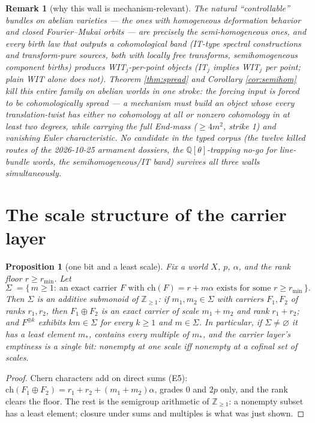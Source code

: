 \documentclass[11pt]{article}
\newtheorem{proposition}{Proposition}
\newtheorem{remark}{Remark}
\begin{document}
\begin{remark}[why this wall is mechanism-relevant]
The natural ``controllable'' bundles on abelian varieties --- the ones with homogeneous deformation
behavior and closed Fourier--Mukai orbits --- are precisely the semi-homogeneous ones, and every birth
law that outputs a cohomological band (IT-type spectral constructions and transform-pure sources,
both with locally free transforms,
semihomogeneous component births) produces WIT$_j$-per-point objects (IT$_j$ implies WIT$_j$ per point;
plain WIT alone does not). Theorem \ref{thm:spread} and
Corollary \ref{cor:semihom} kill this entire family on abelian worlds in one stroke: the forcing input
is \emph{forced to be cohomologically spread} --- a mechanism must build an object whose every
translation-twist has either no cohomology at all or nonzero cohomology in at least two degrees, while carrying the
full End-mass ($\ge4m^2$, strike 1) and vanishing Euler characteristic. No candidate in the typed
corpus (the twelve killed routes of the 2026-10-25 armament dossiers, the $\mathbb{Q}[\theta]$-trapping
no-go for line-bundle words, the semihomogeneous/IT band) survives all three walls simultaneously.
\end{remark}

\section{The scale structure of the carrier layer}\label{sec:scale}

\begin{proposition}[one bit and a least scale]\label{prop:scale}
Fix a world $X$, $p$, $\alpha$, and the rank floor $r\ge r_{\min}$. Let
\[
\Sigma\;=\{\,m\ge1:\ \text{an exact carrier }F\text{ with }\mathrm{ch}(F)=r+m\alpha\text{ exists for some }r\ge r_{\min}\,\}.
\]
Then $\Sigma$ is an additive submonoid of $\mathbb{Z}_{\ge1}$: if $m_1,m_2\in\Sigma$ with carriers
$F_1,F_2$ of ranks $r_1,r_2$, then $F_1\oplus F_2$ is an exact carrier of scale $m_1+m_2$ and rank
$r_1+r_2$; and $F^{\oplus k}$ exhibits $km\in\Sigma$ for every $k\ge1$ and $m\in\Sigma$. In particular,
if $\Sigma\ne\varnothing$ it has a least element $m_\ast$, contains every multiple of $m_\ast$, and the
carrier layer's emptiness is a single bit: \emph{nonempty at one scale iff nonempty at a cofinal set of
scales}.
\end{proposition}

\begin{proof}
Chern characters add on direct sums (E5): $\mathrm{ch}(F_1\oplus F_2)=r_1+r_2+(m_1+m_2)\alpha$, grades
$0$ and $2p$ only, and the rank clears the floor. The rest is the semigroup arithmetic of
$\mathbb{Z}_{\ge1}$: a nonempty subset has a least element; closure under sums and multiples is what was
just shown.
\end{proof}
\end{document}
